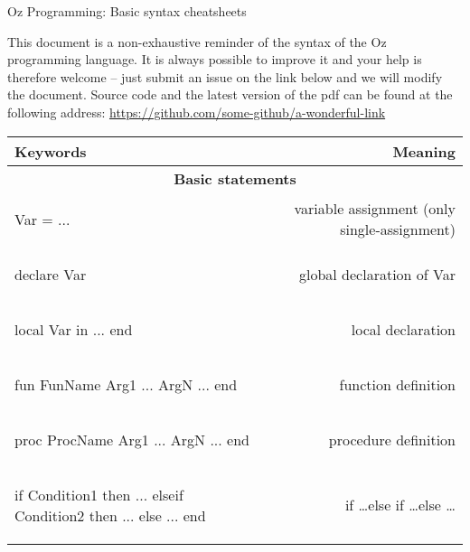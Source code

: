 \documentclass[12pt]{article}
\author{Felten Florian}
\begin{document}
\vspace*{2em}
\begin{center} %
	{\Large Oz Programming: Basic syntax cheatsheets}
\end{center}

This document is a non-exhaustive reminder of the syntax of the Oz programming language. It is always possible to improve it and your help is therefore welcome -- just submit an issue on the link below and we will modify the document. Source code and the latest version of the pdf can be found at the following address:
\url{https://github.com/some-github/a-wonderful-link}

\renewcommand*{\arraystretch}{1.5}
\begin{longtable}{l r}
\toprule[0.2em]
\multicolumn{1}{l}{\textbf{Keywords}} & \textbf{Meaning}\\
\midrule[0.3mm]


\multicolumn{2}{c}{\textbf{Basic statements}}\\
\midrule[0.3mm]

\begin{oz}
Var = ...
\end{oz}
&variable assignment (only single-assignment)\\
\hline

\begin{oz}
declare Var 
\end{oz}
&global declaration of Var\\
\hline
 
\begin{oz}
local Var in 
  ...
end
\end{oz}
&local declaration\\
\hline
 
 
\begin{oz}
fun {FunName Arg1 ... ArgN}
  ...
end
\end{oz}
&function definition\\
\hline
 
\begin{oz}
proc {ProcName Arg1 ... ArgN}
  ...
end
\end{oz}
&procedure definition\\
\hline

\begin{oz}
if Condition1 then ...
elseif Condition2 then ...
else ...
end
\end{oz}
&if \dots else if \dots else \dots \\
\hline
 

\end{longtable}
\end{document}
